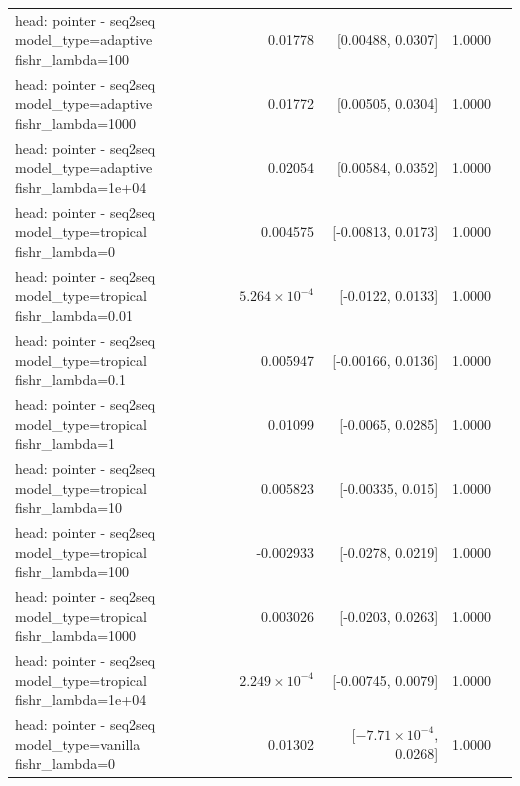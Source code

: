 \documentclass[10pt]{article}
\makeatletter
\newcommand{\stackcell}[1]{\begin{tabular}[t]{@{}l@{}}#1\end{tabular}}
\makeatother
\begin{document}
{\begin{longtable}{lrrrl}
\stackcell{head: pointer - seq2seq\\\footnotesize model\_type=adaptive fishr\_lambda=100 } & 0.01778 & [0.00488, 0.0307] & 1.0000 & \\
\stackcell{head: pointer - seq2seq\\\footnotesize model\_type=adaptive fishr\_lambda=1000 } & 0.01772 & [0.00505, 0.0304] & 1.0000 & \\
\stackcell{head: pointer - seq2seq\\\footnotesize model\_type=adaptive fishr\_lambda=1e+04 } & 0.02054 & [0.00584, 0.0352] & 1.0000 & \\
\stackcell{head: pointer - seq2seq\\\footnotesize model\_type=tropical fishr\_lambda=0 } & 0.004575 & [-0.00813, 0.0173] & 1.0000 & \\
\stackcell{head: pointer - seq2seq\\\footnotesize model\_type=tropical fishr\_lambda=0.01 } & $5.264\times10^{-4}$ & [-0.0122, 0.0133] & 1.0000 & \\
\stackcell{head: pointer - seq2seq\\\footnotesize model\_type=tropical fishr\_lambda=0.1 } & 0.005947 & [-0.00166, 0.0136] & 1.0000 & \\
\stackcell{head: pointer - seq2seq\\\footnotesize model\_type=tropical fishr\_lambda=1 } & 0.01099 & [-0.0065, 0.0285] & 1.0000 & \\
\stackcell{head: pointer - seq2seq\\\footnotesize model\_type=tropical fishr\_lambda=10 } & 0.005823 & [-0.00335, 0.015] & 1.0000 & \\
\stackcell{head: pointer - seq2seq\\\footnotesize model\_type=tropical fishr\_lambda=100 } & -0.002933 & [-0.0278, 0.0219] & 1.0000 & \\
\stackcell{head: pointer - seq2seq\\\footnotesize model\_type=tropical fishr\_lambda=1000 } & 0.003026 & [-0.0203, 0.0263] & 1.0000 & \\
\stackcell{head: pointer - seq2seq\\\footnotesize model\_type=tropical fishr\_lambda=1e+04 } & $2.249\times10^{-4}$ & [-0.00745, 0.0079] & 1.0000 & \\
\stackcell{head: pointer - seq2seq\\\footnotesize model\_type=vanilla fishr\_lambda=0 } & 0.01302 & [$-7.71\times10^{-4}$, 0.0268] & 1.0000 & \\

\end{longtable}}
\end{document}
